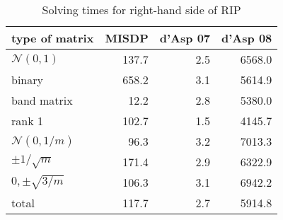 \begin{table} 
 \begin{scriptsize} \caption{Solving times for right-hand side of RIP} 
 \label{rhsTime} 
 \begin{tabular*}{\linewidth}{@{}l@{\;\;\extracolsep{\fill}}rrr@{}}\toprule 
 type of matrix & MISDP & d'Asp 07 & d'Asp 08 \\ \midrule 
$\mathcal{N}(0,1)$& \num{137.7} & \num{2.5} & \num{6568.0} \\ 
 binary& \num{658.2} & \num{3.1} & \num{5614.9} \\ 
 band matrix& \num{12.2} & \num{2.8} & \num{5380.0} \\ 
 rank 1& \num{102.7} & \num{1.5} & \num{4145.7} \\ 
 $\mathcal{N}(0,1/m)$& \num{96.3} & \num{3.2} & \num{7013.3} \\ 
 $\pm 1/\sqrt{m}$& \num{171.4} & \num{2.9} & \num{6322.9} \\ 
 $0, \pm \sqrt{3/m}$& \num{106.3} & \num{3.1} & \num{6942.2} \\ 
 \midrule 
total & \num{117.7} & \num{2.7} & \num{5914.8} \\ 
 \bottomrule 
 \end{tabular*} 
 \end{scriptsize} 
 \end{table} 
